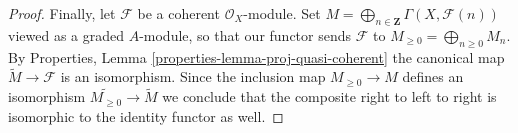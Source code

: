 \documentclass[10pt,a4paper]{amsart}
\theoremstyle{plain}
\theoremstyle{definition}
\theoremstyle{remark}
\numberwithin{equation}{subsection}
\begin{document}
\begin{proof}
\medskip\noindent
Finally, let $\mathcal{F}$ be a coherent $\mathcal{O}_X$-module.
Set $M = \bigoplus_{n \in \mathbf{Z}} \Gamma(X, \mathcal{F}(n))$
viewed as a graded $A$-module, so that our functor sends $\mathcal{F}$ to
$M_{\geq 0} = \bigoplus_{n \geq 0} M_n$.
By Properties, Lemma \ref{properties-lemma-proj-quasi-coherent}
the canonical map $\widetilde M \to \mathcal{F}$
is an isomorphism. Since the inclusion map
$M_{\geq 0} \to M$ defines an isomorphism
$\widetilde{M_{\geq 0}} \to \widetilde M$ we conclude that
the composite right to left to right is isomorphic to the identity
functor as well.
\end{proof}
\end{document}
